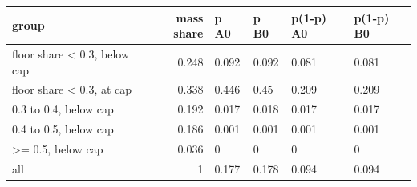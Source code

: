 \begingroup\small
\setlength{\tabcolsep}{3pt}
\renewcommand{\arraystretch}{1.04}
\begin{tabularx}{\linewidth}{XrXXXX}
\toprule
group & mass share & p A0 & p B0 & p(1-p) A0 & p(1-p) B0 \\
\midrule
floor share \textless{} 0.3, below cap & 0.248 & 0.092 & 0.092 & 0.081 & 0.081 \\
floor share \textless{} 0.3, at cap & 0.338 & 0.446 & 0.45 & 0.209 & 0.209 \\
0.3 to 0.4, below cap & 0.192 & 0.017 & 0.018 & 0.017 & 0.017 \\
0.4 to 0.5, below cap & 0.186 & 0.001 & 0.001 & 0.001 & 0.001 \\
\textgreater{}= 0.5, below cap & 0.036 & 0 & 0 & 0 & 0 \\
all & 1 & 0.177 & 0.178 & 0.094 & 0.094 \\
\bottomrule
\end{tabularx}
\endgroup
